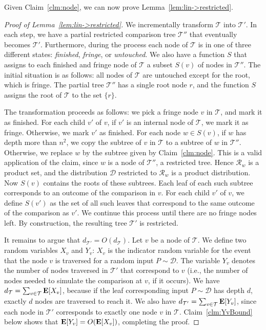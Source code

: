 \documentclass[letterpaper,11pt]{article}
\newcommand{\EX}{\hbox{\bf E}}
\newcommand{\cD}{\mathcal{D}}
\newcommand{\cR}{\mathcal{R}}
\newcommand{\cT}{\mathcal{T}}
\begin{document}
Given Claim~\ref{clm:node}, we can 
now prove Lemma~\ref{lem:lin->restricted}.

\begin{proof}[Proof of Lemma~\ref{lem:lin->restricted}]
We incrementally transform 
$\cT$ into $\cT'$.
In each step, we have 
a partial restricted 
comparison tree $\cT''$ 
that eventually becomes $\cT'$.
Furthermore, during the 
process each node of 
$\cT$ is in one of 
three different states:
\emph{finished}, \emph{fringe}, 
or \emph{untouched}. 
We also have a function $S$
that assigns to each finished and 
fringe node of $\cT$ a subset 
$S(v)$ of nodes in $\cT''$.
The initial situation is 
as follows: all nodes of $\cT$ 
are untouched except for the 
root, which is fringe. 
The partial tree 
$\cT''$ has a single 
root node $r$, and the function
$S$ assigns the root of $\cT$ 
to the set  $\{r\}$.

The transformation proceeds as 
follows: we pick a fringe node 
$v$ in $\cT$, and mark it as finished.
For each child $v'$ of $v$, if $v'$ 
is an internal node of $\cT$, we mark 
it as fringe. Otherwise, we mark 
$v'$ as finished.
For each node $w \in S(v)$,
if $w$ has depth more than $n^2$,
we copy the subtree of $v$ in
$\cT$ to a subtree of $w$ in
$\cT''$.
Otherwise, 
we replace $w$  
by the subtree given 
by Claim~\ref{clm:node}.  This
is a valid application of the claim, 
since $w$ is a node of $\cT''$, a 
restricted tree. 
Hence $\cR_w$ is a 
product set, and the distribution
$\cD$ restricted to $\cR_w$ is 
a product distribution.
Now $S(v)$ contains the roots of 
these subtrees. Each leaf of each such
subtree corresponds to an outcome of 
the comparison in $v$.  
For each child $v'$ of $v$, we define 
$S(v')$ as the set of all such leaves 
that correspond to the same outcome 
of the comparison as $v'$. 
We continue this process until 
there are no fringe nodes left. 
By construction, the resulting 
tree $\cT'$ is restricted. 

It remains to argue that 
$d_{\cT'} = O(d_{\cT})$. 
Let $v$ be a node of $\cT$. 
We define two random variables 
$X_v$ and $Y_v$: $X_v$ is 
the indicator random variable 
for the event that the node
$v$ is traversed for a random 
input $P \sim \cD$.  
The variable $Y_v$ denotes 
the number of nodes traversed 
in $\cT'$ that correspond to $v$ 
(i.e., the number of nodes
needed to simulate the comparison 
at $v$, if it occurs).
We have 
$d_{\cT} = \sum_{v \in \cT} \EX[X_v]$, 
because if the leaf corresponding
input $P \sim \cD$ has depth $d$, exactly 
$d$ nodes are traversed to reach it.
We also have 
$d_{\cT'} = \sum_{v \in \cT} \EX[Y_v]$, 
since each node in $\cT'$ corresponds 
to exactly one node $v$ in $\cT$. 
Claim~\ref{clm:YvBound} below 
shows that $\EX[Y_v] = O(\EX[X_v])$, 
completing the proof.
\end{proof}
\end{document}
